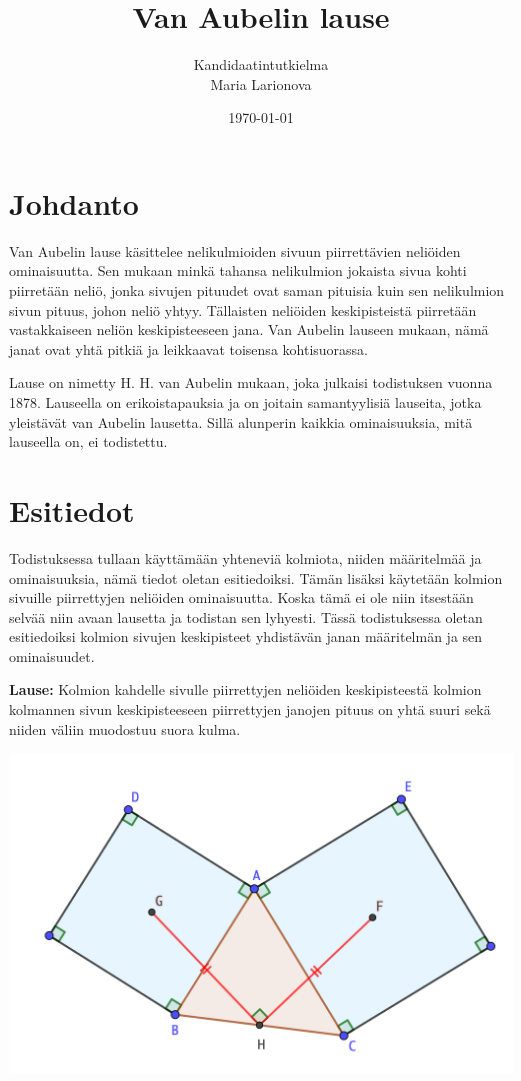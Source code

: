 \documentclass{scrartcl}
\title{Van Aubelin lause}
\author{Kandidaatintutkielma\\Maria Larionova}
\date{\today}
\begin{document}
\maketitle
\pagebreak
\tableofcontents
\pagebreak


\section{Johdanto}
Van Aubelin lause käsittelee nelikulmioiden sivuun piirrettävien neliöiden ominaisuutta. Sen mukaan minkä tahansa nelikulmion jokaista sivua kohti piirretään neliö, jonka sivujen pituudet ovat saman pituisia kuin sen nelikulmion sivun pituus, johon neliö yhtyy. Tällaisten neliöiden keskipisteistä piirretään vastakkaiseen neliön keskipisteeseen jana. Van Aubelin lauseen mukaan, nämä janat ovat yhtä pitkiä ja leikkaavat toisensa kohtisuorassa. 

Lause on nimetty H. H. van Aubelin mukaan, joka julkaisi todistuksen vuonna 1878. Lauseella on erikoistapauksia ja on joitain samantyylisiä lauseita, jotka yleistävät van Aubelin lausetta. Sillä alunperin kaikkia ominaisuuksia, mitä lauseella on, ei todistettu.

\pagebreak
\section{Esitiedot}
Todistuksessa tullaan käyttämään yhteneviä kolmiota, niiden määritelmää ja ominaisuuksia, nämä tiedot oletan esitiedoiksi. Tämän lisäksi käytetään kolmion sivuille piirrettyjen neliöiden ominaisuutta. Koska tämä ei ole niin itsestään selvää niin avaan lausetta ja todistan sen lyhyesti. Tässä todistuksessa oletan esitiedoiksi kolmion sivujen keskipisteet yhdistävän janan määritelmän ja sen ominaisuudet.

\medskip
\textbf{Lause:} Kolmion kahdelle sivulle piirrettyjen neliöiden keskipisteestä kolmion kolmannen sivun keskipisteeseen piirrettyjen janojen pituus on yhtä suuri sekä niiden väliin muodostuu suora kulma.
\begin{center}
    \includegraphics[scale=0.6]{kolmiotodistus.png}
\end{center}
\end{document}
